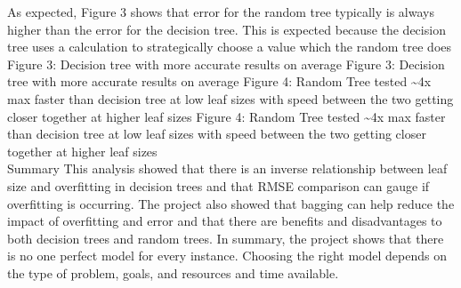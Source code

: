 \documentclass{article}
\begin{document}
As expected, Figure 3 shows that error for the random tree typically is always higher than the error for the decision tree. This is expected because the decision tree uses a calculation to strategically choose a value which the random tree does Figure 3: Decision tree with more accurate results on average
Figure 3: Decision tree with more accurate results on average
Figure 4: Random Tree tested \textasciitilde{}4x max faster than decision tree at low leaf sizes with speed between the two getting closer together at higher leaf sizes
Figure 4: Random Tree tested \textasciitilde{}4x max faster than decision tree at low leaf sizes with speed between the two getting closer together at higher leaf sizes\\

Summary
This analysis showed that there is an inverse relationship between leaf size and overfitting in decision trees and that RMSE comparison can gauge if overfitting is occurring. The project also showed that bagging can help reduce the impact of overfitting and error and that there are benefits and disadvantages to both decision trees and random trees. In summary, the project shows that there is no one perfect model for every instance. Choosing the right model depends on the type of problem, goals, and resources and time available.\\
\end{document}
